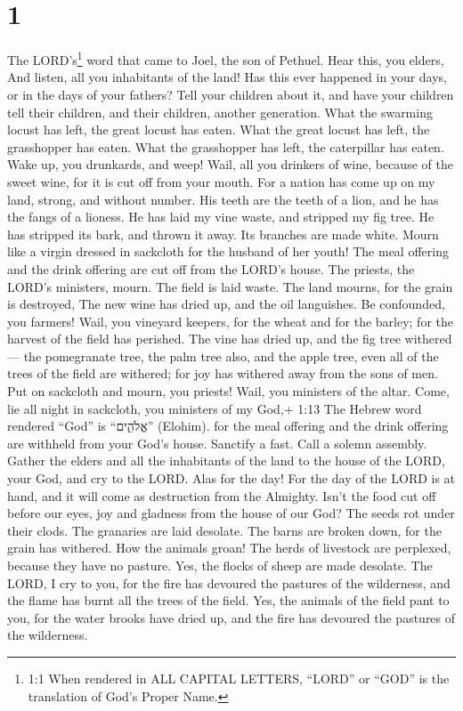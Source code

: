 \hypertarget{section}{%
\section{1}\label{section}}

 The LORD's\footnote{1:1 When rendered in ALL CAPITAL
  LETTERS, ``LORD'' or ``GOD'' is the translation of God's Proper Name.}
word that came to Joel, the son of Pethuel.  Hear this, you
elders, And listen, all you inhabitants of the land! Has this ever
happened in your days, or in the days of your fathers?  Tell
your children about it, and have your children tell their children, and
their children, another generation.  What the swarming
locust has left, the great locust has eaten. What the great locust has
left, the grasshopper has eaten. What the grasshopper has left, the
caterpillar has eaten.  Wake up, you drunkards, and weep!
Wail, all you drinkers of wine, because of the sweet wine, for it is cut
off from your mouth.  For a nation has come up on my land,
strong, and without number. His teeth are the teeth of a lion, and he
has the fangs of a lioness.  He has laid my vine waste, and
stripped my fig tree. He has stripped its bark, and thrown it away. Its
branches are made white.  Mourn like a virgin dressed in
sackcloth for the husband of her youth!  The meal offering
and the drink offering are cut off from the LORD's house. The priests,
the LORD's ministers, mourn.  The field is laid waste. The
land mourns, for the grain is destroyed, The new wine has dried up, and
the oil languishes.  Be confounded, you farmers! Wail, you
vineyard keepers, for the wheat and for the barley; for the harvest of
the field has perished.  The vine has dried up, and the fig
tree withered--- the pomegranate tree, the palm tree also, and the apple
tree, even all of the trees of the field are withered; for joy has
withered away from the sons of men.  Put on sackcloth and
mourn, you priests! Wail, you ministers of the altar. Come, lie all
night in sackcloth, you ministers of my God,+ 1:13 The Hebrew word
rendered ``God'' is ``אֱלֹהִ֑ים'' (Elohim). for the meal offering and
the drink offering are withheld from your God's house. 
Sanctify a fast. Call a solemn assembly. Gather the elders and all the
inhabitants of the land to the house of the LORD, your God, and cry to
the LORD.  Alas for the day! For the day of the LORD is at
hand, and it will come as destruction from the Almighty. 
Isn't the food cut off before our eyes, joy and gladness from the house
of our God?  The seeds rot under their clods. The granaries
are laid desolate. The barns are broken down, for the grain has
withered.  How the animals groan! The herds of livestock
are perplexed, because they have no pasture. Yes, the flocks of sheep
are made desolate.  The LORD, I cry to you, for the fire
has devoured the pastures of the wilderness, and the flame has burnt all
the trees of the field.  Yes, the animals of the field pant
to you, for the water brooks have dried up, and the fire has devoured
the pastures of the wilderness.

